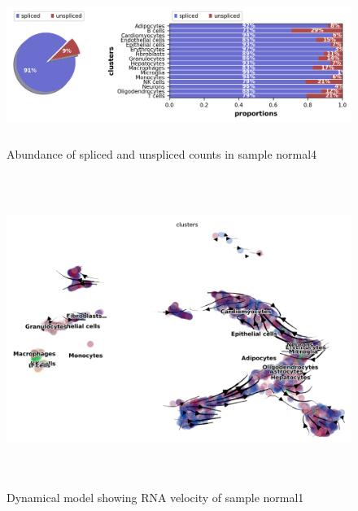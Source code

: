 \begin{figure}[!htb]
\begin{center}
\includegraphics[width=6in,height=2in]{../figures/kidney_mouse/normal4_proportions.png}
\end{center}
\caption{Abundance of spliced and unspliced counts in sample normal4} 
\label{fig:abundance_normal4}
\end{figure}

\begin{figure}[!htb]
\begin{center}
\includegraphics[width=6in,height=4in]{../figures/kidney_mouse/normal1_dynamical_model.png}
\end{center}
\caption{Dynamical model showing RNA velocity of sample normal1} 
\label{fig:velocity_normal1}
\end{figure}

